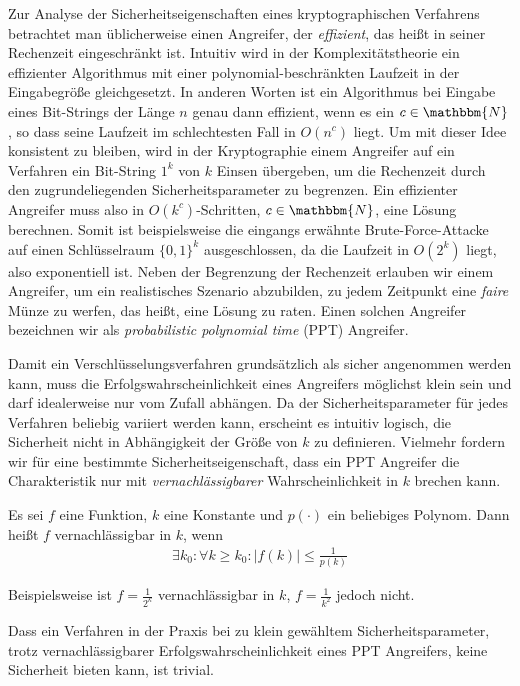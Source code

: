 Zur Analyse der Sicherheitseigenschaften eines kryptographischen Verfahrens betrachtet man üblicherweise einen Angreifer, der \emph{effizient}, das heißt in seiner Rechenzeit eingeschränkt ist. Intuitiv wird in der Komplexitätstheorie ein effizienter Algorithmus mit einer polynomial-beschränkten Laufzeit in der Eingabegröße gleichgesetzt. 
In anderen Worten ist ein Algorithmus bei Eingabe eines Bit-Strings der Länge $n$ genau dann effizient, wenn es ein $c \in \mathbbm{N}$, so dass seine Laufzeit im schlechtesten Fall in $O(n^c)$ liegt.
Um mit dieser Idee konsistent zu bleiben, wird in der Kryptographie einem Angreifer auf ein Verfahren ein Bit-String $1^k$ von $k$ Einsen übergeben, um die Rechenzeit durch den zugrundeliegenden Sicherheitsparameter zu begrenzen. 
Ein effizienter Angreifer muss also in $O(k^c)$-Schritten, $c \in \mathbbm{N}$, eine Lösung berechnen. Somit ist beispielsweise die eingangs erwähnte Brute-Force-Attacke auf einen Schlüsselraum $\{0, 1\}^{k}$ ausgeschlossen, da die Laufzeit in $O(2^{k})$ liegt, also exponentiell ist.
Neben der Begrenzung der Rechenzeit erlauben wir einem Angreifer, um ein realistisches Szenario abzubilden, zu jedem Zeitpunkt eine \emph{faire} Münze zu werfen, das heißt, eine Lösung zu raten. Einen solchen Angreifer bezeichnen wir als \emph{probabilistic polynomial time} (PPT) Angreifer.

Damit ein Verschlüsselungsverfahren grundsätzlich als sicher angenommen werden kann, muss die Erfolgswahrscheinlichkeit eines Angreifers möglichst klein sein und darf idealerweise nur vom Zufall abhängen.
Da der Sicherheitsparameter für jedes Verfahren beliebig variiert werden kann, erscheint es intuitiv logisch, die Sicherheit nicht in Abhängigkeit der Größe von $k$ zu definieren. Vielmehr fordern wir für eine bestimmte Sicherheitseigenschaft, dass ein PPT Angreifer die Charakteristik nur mit \emph{vernachlässigbarer} Wahrscheinlichkeit in $k$ brechen kann.
\begin{definition}[Vernachlässigbarkeit]
	Es sei $f$ eine Funktion, $k$ eine Konstante und $p(\cdot)$ ein beliebiges Polynom. Dann heißt $f$ vernachlässigbar in $k$, wenn
	\begin{align*}
		\exists k_0 : \forall k \geq k_0 : \vert f(k) \vert \leq \frac{1}{p(k)} 
	\end{align*}
\end{definition}
Beispielsweise ist $f = \frac{1}{2^k}$ vernachlässigbar in $k$, $f = \frac{1}{k^2}$ jedoch nicht.

Dass ein Verfahren in der Praxis bei zu klein gewähltem Sicherheitsparameter, trotz vernachlässigbarer Erfolgswahrscheinlichkeit eines PPT Angreifers, keine Sicherheit bieten kann, ist trivial.